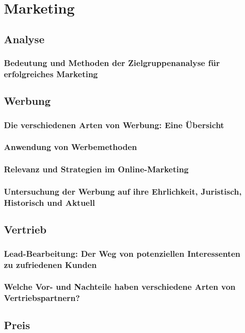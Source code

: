 \chapter{Marketing}
\section{Analyse}
\subsection{Bedeutung und Methoden der Zielgruppenanalyse für erfolgreiches Marketing}

\section{Werbung}
\subsection{Die verschiedenen Arten von Werbung: Eine Übersicht}

\subsection{Anwendung von Werbemethoden}

\subsection{Relevanz und Strategien im Online-Marketing}

\subsection{Untersuchung der Werbung auf ihre Ehrlichkeit, Juristisch, Historisch und Aktuell}

\section{Vertrieb}
\subsection{Lead-Bearbeitung: Der Weg von potenziellen Interessenten zu zufriedenen Kunden}

\subsection{Welche Vor- und Nachteile haben verschiedene Arten von Vertriebspartnern?}

\section{Preis}
